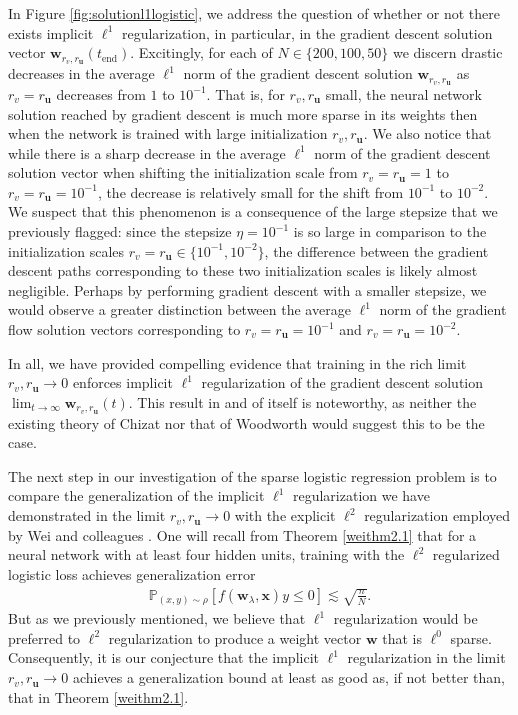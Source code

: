 \documentclass{article}
\begin{document}
In Figure \ref{fig:solutionl1logistic}, we address the question of whether or not there exists implicit $\ell^1$ regularization, in particular, in the gradient descent solution vector $\boldsymbol{w}_{r_v, r_{\boldsymbol{u}}}(t_{\text{end}})$. Excitingly, for each of $N \in \{200, 100, 50\}$ we discern drastic decreases in the average $\ell^1$ norm of the gradient descent solution $\boldsymbol{w}_{r_v, r_{\boldsymbol{u}}}$ as $r_v = r_{\boldsymbol{u}}$ decreases from $1$ to $10^{-1}$. That is, for $r_v, r_{\boldsymbol{u}}$ small, the neural network solution reached by gradient descent is much more sparse in its weights then when the network is trained with large initialization $r_v, r_{\boldsymbol{u}}$. We also notice that while there is a sharp decrease in the average $\ell^1$ norm of the gradient descent solution vector when shifting the initialization scale from $r_v = r_{\boldsymbol{u}} = 1$ to $r_v = r_{\boldsymbol{u}} = 10^{-1}$, the decrease is relatively small for the shift from $10^{-1}$ to $10^{-2}$. We suspect that this phenomenon is a consequence of the large stepsize that we previously flagged: since the stepsize $\eta = 10^{-1}$ is so large in comparison to the initialization scales $r_v = r_{\boldsymbol{u}} \in \{10^{-1}, 10^{-2} \}$, the difference between the gradient descent paths corresponding to these two initialization scales is likely almost negligible. Perhaps by performing gradient descent with a smaller stepsize, we would observe a greater distinction between the average $\ell^1$ norm of the gradient flow solution vectors corresponding to $r_v = r_{\boldsymbol{u}} = 10^{-1}$ and $r_v = r_{\boldsymbol{u}} = 10^{-2}$. 

In all, we have provided compelling evidence that training in the rich limit $r_{v}, r_{\boldsymbol{u}} \rightarrow 0$ enforces implicit $\ell^1$ regularization of the gradient descent solution $\lim_{t \to \infty} \boldsymbol{w}_{r_v, r_{\boldsymbol{u}}}(t)$. This result in and of itself is noteworthy, as neither the existing theory of Chizat nor that of Woodworth would suggest this to be the case. 

The next step in our investigation of the sparse logistic regression problem is to compare the generalization of the implicit $\ell^1$ regularization we have demonstrated in the limit $r_v, r_{\boldsymbol{u}} \rightarrow 0$ with the explicit $\ell^2$ regularization employed by Wei and colleagues \cite{wei2019regularization}. One will recall from Theorem \ref{weithm2.1} that for a neural network with at least four hidden units, training with the $\ell^2$ regularized logistic loss achieves generalization error
\begin{align*}
   \mathbb{P}_{(x,y) \sim \rho}[f(\boldsymbol{w}_{\lambda}, \boldsymbol{x})y \leq 0] \lesssim \sqrt{\frac{n}{N}}.
\end{align*}
But as we previously mentioned, we believe that $\ell^1$ regularization would be preferred to $\ell^2$ regularization to produce a weight vector $\boldsymbol{w}$ that is $\ell^0$ sparse. Consequently, it is our conjecture that the implicit $\ell^1$ regularization in the limit $r_v, r_{\boldsymbol{u}} \rightarrow 0$ achieves a generalization bound at least as good as, if not better than, that in Theorem \ref{weithm2.1}.
\end{document}
